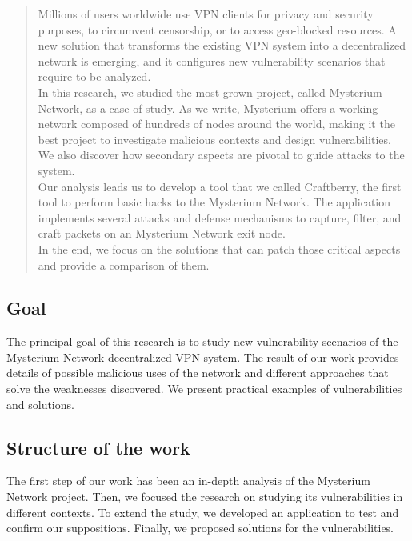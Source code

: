\documentclass[12pt]{article}
\begin{document}
	\begin{abstract}
	\begin{flushleft}
		Millions of users worldwide use VPN clients for privacy and security purposes, to circumvent censorship, or to access geo-blocked resources. A new solution that transforms the existing VPN system into a decentralized network is emerging, and it configures new vulnerability scenarios that require to be analyzed.\\ 
    	In this research, we studied the most grown project, called Mysterium Network, as a case of study. As we write, Mysterium offers a working network composed of hundreds of nodes around the world, making it the best project to investigate malicious contexts and design vulnerabilities. We also discover how secondary aspects are pivotal to guide attacks to the system.\\
		Our analysis leads us to develop a tool that we called Craftberry, the first tool to perform basic hacks to the Mysterium Network. The application implements several attacks and defense mechanisms to capture, filter, and craft packets on an Mysterium Network exit node.\\
		In the end, we focus on the solutions that can patch those critical aspects and provide a comparison of them.
	\end{flushleft}
	\end{abstract}
		
	\pagebreak

	\subsection{Goal}
	The principal goal of this research is to study new vulnerability scenarios of the  Mysterium Network decentralized VPN system. The result of our work provides details of possible malicious uses of the network and different approaches that solve the weaknesses discovered. We present practical examples of vulnerabilities and solutions.

	\subsection{Structure of the work}
	The first step of our work has been an in-depth analysis of the Mysterium Network project. Then, we focused the research on studying its vulnerabilities in different contexts. To extend the study, we developed an application to test and confirm our suppositions. Finally, we proposed solutions for the vulnerabilities. 
\end{document}
